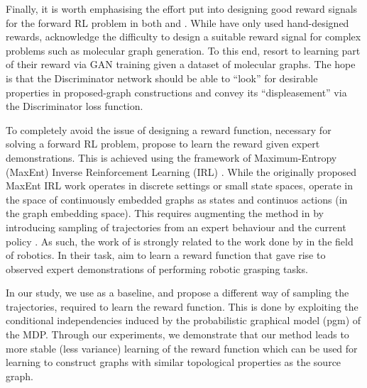 \documentclass{report}
\numberwithin{equation}{section}
\numberwithin{figure}{section}
\numberwithin{table}{section}
\numberwithin{algorithm}{section}
\begin{document}
Finally, it is worth emphasising the effort put into 
designing good reward signals for the forward RL problem 
in both \cite{Darvariu} and \cite{GCNPolicyGraphGen}. While 
\cite{Darvariu} have only used hand-designed rewards, 
\cite{GCNPolicyGraphGen} acknowledge the difficulty to 
design a suitable reward signal for complex problems 
such as molecular graph generation. To this end, 
\cite{GCNPolicyGraphGen} resort to learning part 
of their reward via GAN training given a dataset of molecular 
graphs. The hope is that the Discriminator network should be 
able to ``look'' for desirable properties in proposed-graph 
constructions and convey its ``displeasement'' via the 
Discriminator loss function.

To completely avoid the issue of designing a reward function, 
necessary for solving a forward RL problem,
\cite{GraphOpt} propose to learn the reward given expert 
demonstrations. This is achieved using the framework of 
Maximum-Entropy (MaxEnt) Inverse Reinforcement 
Learning (IRL) \citep{Ziebart2008}. 
While the originally proposed MaxEnt IRL work \citep{Ziebart2008} 
operates in discrete settings or small state spaces, \cite{GraphOpt} 
operate in the space of continuously embedded graphs as states and 
continuos actions (in the graph embedding space). This 
requires augmenting the method in \cite{Ziebart2008} by 
introducing sampling of trajectories from an expert behaviour 
and the current policy \citep{FinnGCL}. As such, 
the work of \cite{GraphOpt} 
is strongly related to the work done by \cite{FinnGCL} in the field 
of robotics. In their task, \cite{FinnGCL} aim to learn a reward function 
that gave rise to observed expert demonstrations of performing 
robotic grasping tasks.

In our study, we use \cite{GraphOpt} as a baseline, and propose 
a different way of sampling the trajectories, required to learn 
the reward function. This is done by exploiting the conditional 
independencies induced by the probabilistic graphical 
model (pgm) of the MDP. Through our experiments, we demonstrate 
that our method leads to 
more stable (less variance) learning of the reward function 
which can be used for learning to construct graphs with 
similar topological properties as the source graph.
\end{document}
